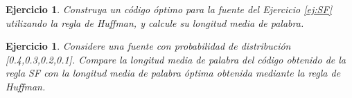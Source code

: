 \documentclass{beamer}
\newtheorem{ejercicio} [Corolario]{Ejercicio}
\begin{document}
\begin{frame}  \small

\begin{ejercicio}
Construya un código óptimo para la fuente del Ejercicio \ref{ej:SF} utilizando la regla de Huffman, y calcule su longitud media de palabra.
\end{ejercicio}

\begin{ejercicio}
Considere una fuente con probabilidad de distribución [0.4,0.3,0.2,0.1]. Compare la longitud media de palabra del código obtenido de la regla SF con la longitud media de palabra óptima obtenida mediante la regla de Huffman.
\end{ejercicio}



\end{frame} 



\end{document}
